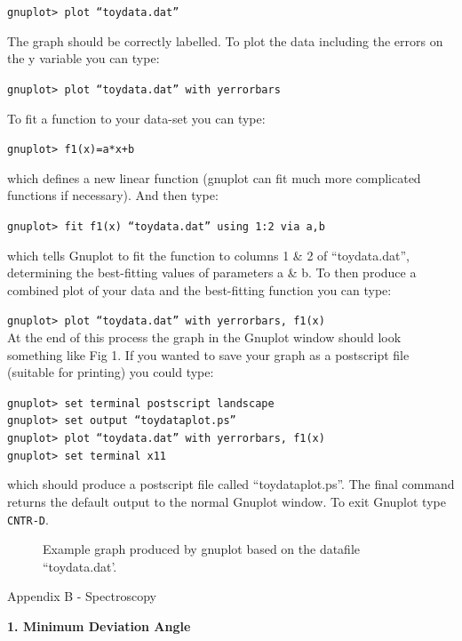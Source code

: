 \documentclass[12pt]{article}
\begin{document}
{\tt gnuplot> plot ``toydata.dat''}

The graph should be correctly labelled. To plot the data including the
errors on the y variable you can type:

{\tt gnuplot> plot ``toydata.dat'' with yerrorbars}

To fit a function to your data-set you can type:

{\tt gnuplot> f1(x)=a*x+b}

which defines a new linear function (gnuplot can fit much more
complicated functions if necessary). And then type:

{\tt gnuplot> fit f1(x) ``toydata.dat'' using 1:2 via a,b}

which tells Gnuplot to fit the function to columns 1 \& 2 of
``toydata.dat'', determining the best-fitting values of parameters a
\& b. To then produce a combined plot of your data and the best-fitting
function you can type:

{\tt gnuplot> plot ``toydata.dat'' with yerrorbars, f1(x)}\\
\newpage
At the end of this process the graph in the Gnuplot window should look
something like Fig 1. If you wanted to save your graph as a postscript
file (suitable for printing) you could type:

{\tt gnuplot> set terminal postscript landscape}\\
{\tt gnuplot> set output ``toydataplot.ps''}\\
{\tt gnuplot> plot ``toydata.dat'' with yerrorbars, f1(x)}\\
{\tt gnuplot> set terminal x11}

which should produce a postscript file called ``toydataplot.ps''. The
final command returns the default output to the normal Gnuplot
window. To exit Gnuplot type {\tt CNTR-D}.

\begin{figure}
\centerline{}
\caption{Example graph produced 
by gnuplot based on the datafile ``toydata.dat'.}
\end{figure}


\newpage
\pagestyle{empty}

\centerline{\hspace{-2cm}  \Huge Appendix B - Spectroscopy}

\begin{center}
{\large {\bf 1. Minimum Deviation Angle}}
\end{center}
\centerline{}
\end{document}
